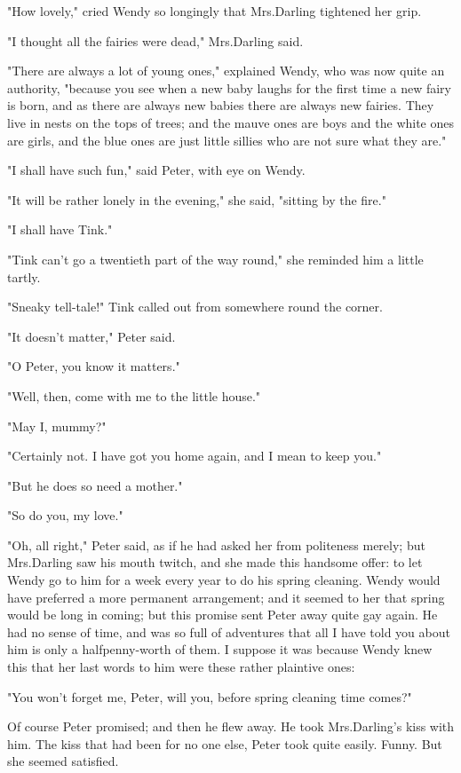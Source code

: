 "How lovely," cried Wendy so longingly that Mrs.\@ Darling tightened her grip.

"I thought all the fairies were dead," Mrs.\@ Darling said.

"There are always a lot of young ones," explained Wendy, who was now quite an authority,
"because you see when a new baby laughs for the first time a new fairy is born,
and as there are always new babies there are always new fairies.
They live in nests on the tops of trees;
and the mauve ones are boys and the white ones are girls,
and the blue ones are just little sillies who are not sure what they are."

"I shall have such fun," said Peter, with eye on Wendy.

"It will be rather lonely in the evening," she said, "sitting by the fire."

"I shall have Tink."

"Tink can't go a twentieth part of the way round," she reminded him a little tartly.

"Sneaky tell-tale!\@" Tink called out from somewhere round the corner.

"It doesn't matter," Peter said.

"O Peter, you know it matters."

"Well, then, come with me to the little house."

"May I, mummy?"

"Certainly not.
I have got you home again, and I mean to keep you."

"But he does so need a mother."

"So do you, my love."

"Oh, all right," Peter said, as if he had asked her from politeness merely;
but Mrs.\@ Darling saw his mouth twitch, and she made this handsome offer:
to let Wendy go to him for a week every year to do his spring cleaning.
Wendy would have preferred a more permanent arrangement;
and it seemed to her that spring would be long in coming;
but this promise sent Peter away quite gay again.
He had no sense of time,
and was so full of adventures that all I have told you about him is only a halfpenny-worth of them.
I suppose it was because Wendy knew this that her last words to him were these rather plaintive ones:

"You won't forget me, Peter, will you,
before spring cleaning time comes?"

Of course Peter promised;
and then he flew away.
He took Mrs.\@ Darling's kiss with him.
The kiss that had been for no one else, Peter took quite easily.
Funny.
But she seemed satisfied.

